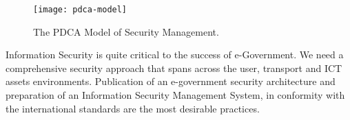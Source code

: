 \begin{figure}[hpb]
	\centering
	\texttt{[image: pdca-model]}
	\caption{The PDCA Model of Security Management.}\label{fig:pdca-model}
\end{figure}

 
Information Security is quite critical to the success of e-Government. We need a comprehensive security approach that spans across the user, transport and ICT assets environments. Publication of an e-government security architecture and preparation of an Information Security Management System, in conformity with the international standards are the most desirable practices.




 